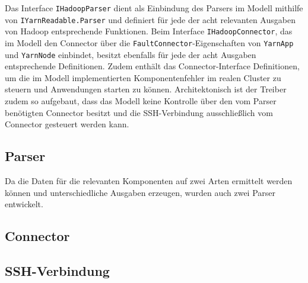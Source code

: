Das Interface \texttt{IHadoopParser} dient als Einbindung des Parsers im Modell mithilfe von \texttt{IYarnReadable.Parser} und definiert für jede der acht relevanten Ausgaben von Hadoop entsprechende Funktionen. Beim Interface \texttt{IHadoopConnector}, das im Modell den Connector über die \texttt{FaultConnector}-Eigenschaften von \texttt{YarnApp} und \texttt{YarnNode} einbindet, besitzt ebenfalls für jede der acht Ausgaben entsprechende Definitionen. Zudem enthält das Connector-Interface Definitionen, um die im Modell implementierten Komponentenfehler im realen Cluster zu steuern und Anwendungen starten zu können. Architektonisch ist der Treiber zudem so aufgebaut, dass das Modell keine Kontrolle über den vom Parser benötigten Connector besitzt und die SSH-Verbindung ausschließlich vom Connector gesteuert werden kann.

\subsection{Parser}\label{sec:cmdParser}

Da die Daten für die relevanten Komponenten auf zwei Arten ermittelt werden können und unterschiedliche Ausgaben erzeugen, wurden auch zwei Parser entwickelt.


\subsection{Connector}\label{sec:Connector}


\subsection{SSH-Verbindung}\label{sec:sshConnection}

